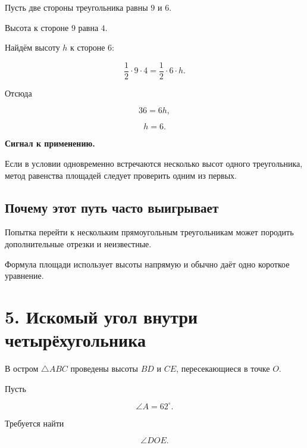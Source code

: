 \documentclass[a4paper,12pt]{article}
\newcommand{\important}[1]{%
  \textbf{\color{darkaccent}#1}%
}
\begin{document}
Пусть две стороны треугольника равны $9$ и $6$.

Высота к стороне $9$ равна $4$.

Найдём высоту $h$ к стороне $6$:

\[
\frac12\cdot9\cdot4
=
\frac12\cdot6\cdot h.
\]

Отсюда

\[
36=6h,
\]

\[
\boxed{h=6}.
\]

\important{Сигнал к применению.}
Если в условии одновременно встречаются несколько высот
одного треугольника, метод равенства площадей
следует проверить одним из первых.

\subsection{Почему этот путь часто выигрывает}

Попытка перейти к нескольким прямоугольным треугольникам
может породить дополнительные отрезки и неизвестные.

Формула площади использует высоты напрямую
и обычно даёт одно короткое уравнение.


\clearpage
\section{5. Искомый угол внутри четырёхугольника}

В остром $\triangle ABC$ проведены высоты $BD$ и $CE$,
пересекающиеся в точке $O$.

Пусть

\[
\angle A=62^\circ.
\]

Требуется найти

\[
\angle DOE.
\]

\begin{center}
\end{center}
\end{document}

